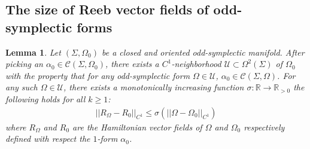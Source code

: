 \documentclass[11pt]{amsart}
\theoremstyle{plain}
\newtheorem{lemma}[theorem]{Lemma}
\theoremstyle{definition}
\theoremstyle{remark}
\begin{document}
\subsection{The size of Reeb vector fields of odd-symplectic forms}
\begin{lemma}\label{Reeb_dist_lemma}
Let $(\Sigma,\Omega_0)$ be a closed and oriented odd-symplectic manifold. After picking an $\alpha_0 \in \mathcal{C}(\Sigma,\Omega_0)$, there exists a $C^1$-neighborhood $\mathcal{U} \subset \Omega^2(\Sigma)$ of $\Omega_0$ with the property that for any odd-symplectic form $\Omega \in \mathcal{U}$, $\alpha_0 \in \mathcal{C}(\Sigma,\Omega)$. For any such $\Omega \in \mathcal{U}$, there exists a monotonically increasing function $\sigma: \mathbb{R} \rightarrow \mathbb{R}_{>0}$ the following holds for all $k\geq 1$:
\begin{align}
     \vert\vert R_{\Omega} - R_{0}\vert\vert _{C^{1}} \leq \sigma(\vert\vert \Omega - \Omega_0\vert\vert _{C^{1}}) 
\end{align}
where $R_{\Omega}$ and $R_{0}$ are the Hamiltonian vector fields of $\Omega$ and $\Omega_0$ respectively defined with respect the $1$-form $\alpha_0$. 
\end{lemma}
\end{document}
